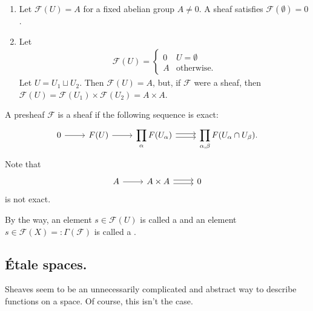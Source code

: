 \documentclass [11 pt, oneside] {article}
\begin{document}
\begin{example}\label{}\text{}
\begin{enumerate}
	\item Let $\mathscr{F}(U) = A$ for a fixed abelian group $A\ne 0$. A sheaf satisfies $\mathscr{F}(\emptyset) = 0$.
	\item Let
		\begin{align*}
			\mathscr{F}(U) = 
			 \begin{cases}
				 0&U=\emptyset\\
				 A&\textrm{otherwise.}
			\end{cases}
		\end{align*}
		Let $U = U_1\sqcup U_2$. Then $\mathscr{F}(U) =A$, but, if $\mathscr{F}$ were a sheaf, then $\mathscr{F}(U) =  \mathscr{F}(U_1)\times \mathscr{F}(U_2) = A\times A$.
\end{enumerate}

A presheaf $\mathscr{F}$ is a sheaf if the following sequence is exact:
\[
\begin{tikzcd}
	0 \ar[r] & \mathscr{F}(U) \ar[r] & \displaystyle\prod_\alpha  \mathscr{F}(U_\alpha) \ar[r, yshift = 0.5 ex] \ar[r, yshift = -0.5 ex] & \displaystyle\prod_{\alpha,\beta}  \mathscr{F}(U_\alpha\cap U_\beta).
\end{tikzcd}
\]
Note that 
\[
\begin{tikzcd}
	A\ar[r] &A\times A \ar[r, yshift = 0.5 ex] \ar[r, yshift = -0.5 ex] & 0 
\end{tikzcd}
\]
is not exact.
\end{example}

By the way, an element $s\in \mathscr{F}(U)$ is called a  and an element $s\in \mathscr{F}(X)=: \Gamma(\mathscr{F})$ is called a .

\subsection{\'Etale spaces.}
Sheaves seem to be an unnecessarily complicated and abstract way to describe functions on a space. Of course, this isn't the case.
\end{document}
